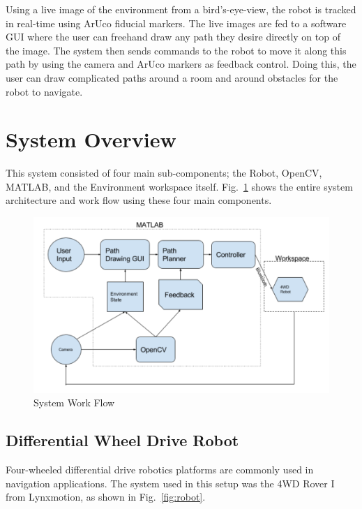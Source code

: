 \documentclass[12pt,american]{report}
\begin{document}
Using a live image of the environment from a bird's-eye-view, the robot is tracked in real-time using ArUco fiducial markers.  The live images are fed to a software GUI where the user can freehand draw any path they desire directly on top of the image.  The system then sends commands to the robot to move it along this path by using the camera and ArUco markers as feedback control. Doing this, the user can draw complicated paths around a room and around obstacles for the robot to navigate. 

\section{System Overview}
This system consisted of four main sub-components; the Robot, OpenCV, MATLAB, and the Environment workspace itself. Fig.~\ref{fig:workflow} shows the entire system architecture and work flow using these four main components.
\begin{figure}[h!]
\centering
\includegraphics[scale=.5]{images/workflow.PNG}
\caption{System Work Flow}
\label{fig:workflow}
\end{figure}

\subsection{Differential Wheel Drive Robot}
Four-wheeled differential drive robotics platforms are commonly used in navigation applications. The system used in this setup was the 4WD Rover I from Lynxmotion, as shown in Fig.~\ref{fig:robot}.
\end{document}
